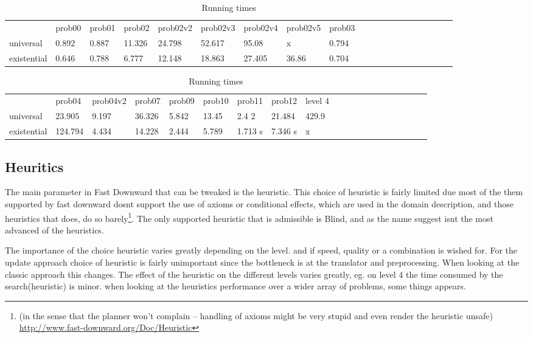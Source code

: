 			\begin{table}[h]
				\centering
				\caption{Running times}
				\label{times}
				\begin{tabular}{llllllllllllllllllll}
					& prob00 & prob01& prob02& prob02v2& prob02v3& prob02v4& prob02v5& prob03\\
					universal 	& 0.892  &0.887  &11.326 &24.798   &52.617   &95.08    & x       &0.794    \\
					existential &0.646   &0.788  &6.777  &12.148   &18.863   &27.405   &36.86    &0.704  \\
				\end{tabular}
				\begin{tabular}{llllllllllllllllllll}
					&  prob04& prob04v2& prob07&  prob09& prob10& prob11& prob12 & level 4\\
					universal    &23.905  &9.197      &36.326   &5.842  &13.45  &2.4 2           &21.484 &429.9\\
					existential      &124.794 &4.434   &14.228 &2.444  &5.789  &1.713 s        &7.346 s & x\\
				\end{tabular}
			\end{table}


\subsection{Heuritics}
The main parameter in Fast Downward that can be tweaked is the heuristic. This choice of heuristic is fairly limited due most of the them supported by fast downward dosnt support the use of axioms or conditional effects, which are used in the domain description, and those heuristics that does, do so barely\footnote{(in the sense that the planner won't complain -- handling of axioms might be very stupid and even render the heuristic unsafe) \url{http://www.fast-downward.org/Doc/Heuristic}}. The only supported heuristic that is admissible is Blind, and as the name suggest isnt the most advanced of the heuristics.

The importance of the choice heuristic varies greatly depending on the level. and if speed, quality or a combination is wished for. For the update approach choice of heuristic is fairly unimportant since the bottleneck is at the translator and preprocessing. When looking at the classic approach this changes. The effect of the heuristic on the different levels varies greatly, eg. on level 4 the time consumed by the search(heuristic) is minor. when looking at the heuristics performance over a wider array of problems, some things appears.

